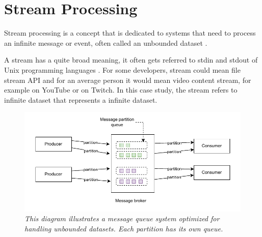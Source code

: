 %
%
%
%
%


\section{Stream Processing}\label{sec:-concepts}
Stream processing is a concept that is dedicated to systems that need to process an infinite
message or event, often called an unbounded dataset \cite{Dataflow2015}.

A stream has a quite broad meaning, it often gets referred to
stdin and stdout of Unix programming languages \cite{kleppmann2017}.
For some developers, stream could mean file stream API and
for an average person it would mean video content stream, for example
on YouTube or on Twitch.
In this case study, the stream refers to infinite dataset that represents
a infinite dataset.

\begin{figure}[H]
    \centering
    \includegraphics[width=1\textwidth]{figures/producer-consumer}
    \caption{\textit{This diagram illustrates a message queue system optimized for handling unbounded datasets.
    Each partition has its own queue.}}
    \label{fig:producer-consumer}
\end{figure}


